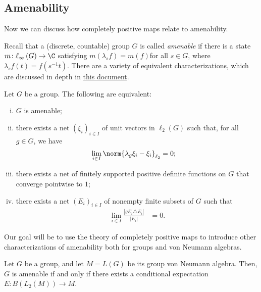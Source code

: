 \documentclass[10pt]{mypackage}
\begin{document}
\subsection{Amenability}%
Now we can discuss how completely positive maps relate to amenability.

Recall that a (discrete, countable) group $G$ is called \textit{amenable} if there is a state $m\colon \ell_{\infty}\left( G \right)\rightarrow \C$ satisfying $m\left( \lambda_sf \right) = m(f)$for all $s\in G$, where $\lambda_sf(t) = f\left( s^{-1}t \right)$. There are a variety of equivalent characterizations, which are discussed in depth in \href{https://ai.avinash-iyer.com/Classes_and_Homework/College/Y4/Honors\%20Thesis/Amenability\%20Text/amenability.pdf}{this document}.
\begin{proposition}
  Let $G$ be a group. The following are equivalent:
  \begin{enumerate}[(i)]
    \item $G$ is amenable;
    \item there exists a net $\left( \xi_i \right)_{i\in I}$ of unit vectors in $\ell_2\left( G \right)$ such that, for all $g\in G$, we have
      \begin{align*}
        \lim_{i\in I}\norm{\lambda_g\xi_i-\xi_i}_{\ell_2} &= 0;
      \end{align*}
    \item there exists a net of finitely supported positive definite functions on $G$ that converge pointwise to $1$;
    \item there exists a net $\left( E_i \right)_{i\in I}$ of nonempty finite subsets of $G$ such that
      \begin{align*}
        \lim_{i\in I} \frac{\left\vert gE_i\triangle E_i \right\vert}{\left\vert E_i \right\vert} &= 0.
      \end{align*}
  \end{enumerate}
\end{proposition}
Our goal will be to use the theory of completely positive maps to introduce other characterizations of amenability both for groups and von Neumann algebras.
\begin{proposition}
  Let $G$ be a group, and let $M = L(G)$ be its group von Neumann algebra. Then, $G$ is amenable if and only if there exists a conditional expectation $E\colon B\left( L_2\left( M \right) \right)\rightarrow M$.
\end{proposition}
\end{document}

